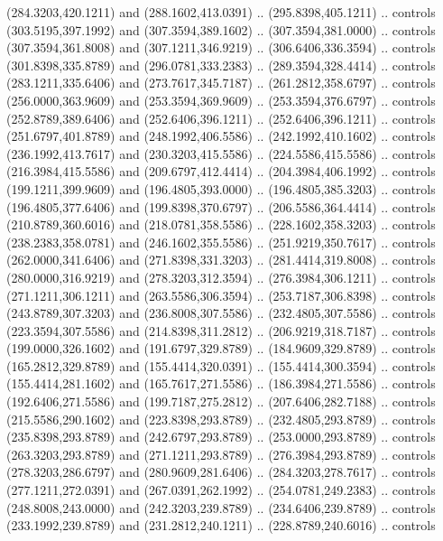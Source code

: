 {{\begin{scope}[y=-0.80pt,x=0.80pt,scale=0.038,xshift=-135pt,yshift=355pt]
        (284.3203,420.1211) and (288.1602,413.0391) .. (295.8398,405.1211) .. controls
        (303.5195,397.1992) and (307.3594,389.1602) .. (307.3594,381.0000) .. controls
        (307.3594,361.8008) and (307.1211,346.9219) .. (306.6406,336.3594) .. controls
        (301.8398,335.8789) and (296.0781,333.2383) .. (289.3594,328.4414) .. controls
        (283.1211,335.6406) and (273.7617,345.7187) .. (261.2812,358.6797) .. controls
        (256.0000,363.9609) and (253.3594,369.9609) .. (253.3594,376.6797) .. controls
        (252.8789,389.6406) and (252.6406,396.1211) .. (252.6406,396.1211) .. controls
        (251.6797,401.8789) and (248.1992,406.5586) .. (242.1992,410.1602) .. controls
        (236.1992,413.7617) and (230.3203,415.5586) .. (224.5586,415.5586) .. controls
        (216.3984,415.5586) and (209.6797,412.4414) .. (204.3984,406.1992) .. controls
        (199.1211,399.9609) and (196.4805,393.0000) .. (196.4805,385.3203) .. controls
        (196.4805,377.6406) and (199.8398,370.6797) .. (206.5586,364.4414) .. controls
        (210.8789,360.6016) and (218.0781,358.5586) .. (228.1602,358.3203) .. controls
        (238.2383,358.0781) and (246.1602,355.5586) .. (251.9219,350.7617) .. controls
        (262.0000,341.6406) and (271.8398,331.3203) .. (281.4414,319.8008) .. controls
        (280.0000,316.9219) and (278.3203,312.3594) .. (276.3984,306.1211) .. controls
        (271.1211,306.1211) and (263.5586,306.3594) .. (253.7187,306.8398) .. controls
        (243.8789,307.3203) and (236.8008,307.5586) .. (232.4805,307.5586) .. controls
        (223.3594,307.5586) and (214.8398,311.2812) .. (206.9219,318.7187) .. controls
        (199.0000,326.1602) and (191.6797,329.8789) .. (184.9609,329.8789) .. controls
        (165.2812,329.8789) and (155.4414,320.0391) .. (155.4414,300.3594) .. controls
        (155.4414,281.1602) and (165.7617,271.5586) .. (186.3984,271.5586) .. controls
        (192.6406,271.5586) and (199.7187,275.2812) .. (207.6406,282.7188) .. controls
        (215.5586,290.1602) and (223.8398,293.8789) .. (232.4805,293.8789) .. controls
        (235.8398,293.8789) and (242.6797,293.8789) .. (253.0000,293.8789) .. controls
        (263.3203,293.8789) and (271.1211,293.8789) .. (276.3984,293.8789) .. controls
        (278.3203,286.6797) and (280.9609,281.6406) .. (284.3203,278.7617) .. controls
        (277.1211,272.0391) and (267.0391,262.1992) .. (254.0781,249.2383) .. controls
        (248.8008,243.0000) and (242.3203,239.8789) .. (234.6406,239.8789) .. controls
        (233.1992,239.8789) and (231.2812,240.1211) .. (228.8789,240.6016) .. controls

\end{scope}}}

